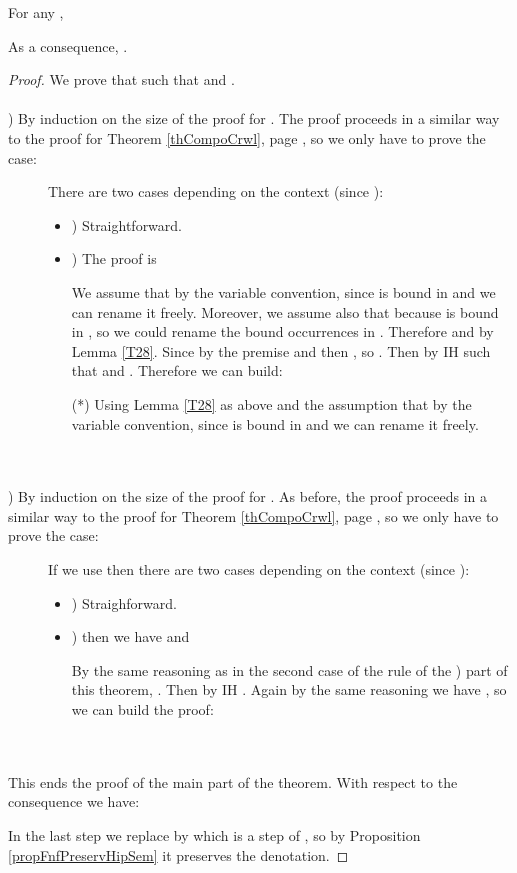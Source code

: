 For any , 

As a consequence, .

\begin{proof}\label{DEMO_lem:weakcomp}
We prove that  such that  and .
~\\~\\
) By induction on the size of the proof for . The proof proceeds in a similar way to the proof for Theorem \ref{thCompoCrwl}, page \pageref{DEMO_thCompoCrwl}, so we only have to prove the  case:
\begin{description}
\item[] There are two cases depending on the context  (since ):
    \begin{itemize}
    \item ) Straightforward.
    \item ) The proof is
    
    We assume that  by the variable convention, since  is bound in  and we can rename it freely. Moreover, we assume also that  because  is bound in , so we could rename the bound occurrences in . Therefore  and  by Lemma \ref{T28}. Since  by the premise and  then , so . Then by IH  such that  and . Therefore we can build:
    
    (*) Using Lemma \ref{T28} as above and the assumption that  by the variable convention, since  is bound in  and we can rename it freely.
    \end{itemize}
\end{description}
~\\~\\
) By induction on the size of the proof for . As before, the proof proceeds in a similar way to the proof for Theorem \ref{thCompoCrwl}, page \pageref{DEMO_thCompoCrwl}, so we only have to prove the  case:

\begin{description}
\item[] If we use  then there are two cases depending on the context  (since ):
    \begin{itemize}
    \item ) Straighforward.
\item ) then we have  and
        
        By the same reasoning as in the second case of the  rule of the ) part of this theorem, . Then by IH . Again by the same reasoning we have , so we can build the proof:

\end{itemize}
\end{description}



~\\~\\This ends the proof of the main part of the theorem. With respect to the consequence  we have:


In the last step we replace  by  which is a  step of , so by Proposition \ref{propFnfPreservHipSem} it preserves the denotation.
\end{proof}

